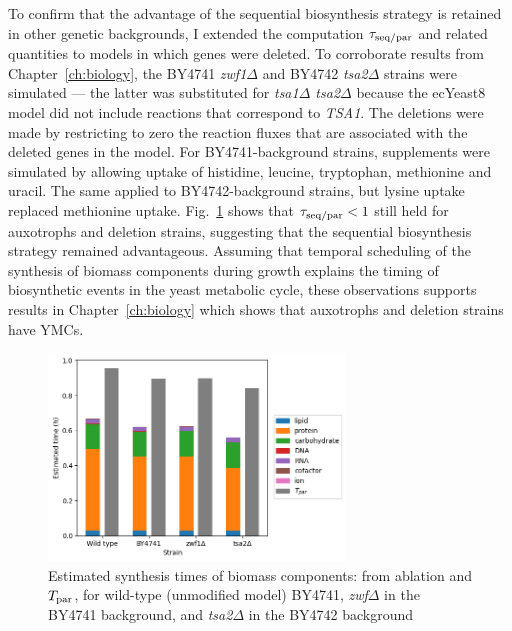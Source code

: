 To confirm that the advantage of the sequential biosynthesis strategy is retained in other genetic backgrounds, I extended the computation $\tau_{\mathrm{seq}/\mathrm{par}}$ and related quantities to models in which genes were deleted.
To corroborate results from Chapter~\ref{ch:biology}, the BY4741 \textit{zwf1$\Delta$} and BY4742 \textit{tsa2$\Delta$} strains were simulated --- the latter was substituted for \textit{tsa1$\Delta$ tsa2$\Delta$} because the ecYeast8 model did not include reactions that correspond to \textit{TSA1}.
The deletions were made by restricting to zero the reaction fluxes that are associated with the deleted genes in the model.
For BY4741-background strains, supplements were simulated by allowing uptake of histidine, leucine, tryptophan, methionine and uracil.
The same applied to BY4742-background strains, but lysine uptake replaced methionine uptake.
Fig.\ \ref{fig:model-ablation-strains} shows that $\tau_{\mathrm{seq}/\mathrm{par}} < 1$ still held for auxotrophs and deletion strains, suggesting that the sequential biosynthesis strategy remained advantageous.
Assuming that temporal scheduling of the synthesis of biomass components during growth explains the timing of biosynthetic events in the yeast metabolic cycle, these observations supports results in Chapter~\ref{ch:biology} which shows that auxotrophs and deletion strains have YMCs.

\begin{figure}
  \centering
  \includegraphics[width=0.7\textwidth]{deletions}

  \caption[
    Estimated synthesis times of biomass components, for BY4741, \textit{zwf$\Delta$}, and \textit{tsa2$\Delta$}
  ]{
    Estimated synthesis times of biomass components: from ablation and $T_{\mathrm{par}}$, for wild-type (unmodified model) BY4741, \textit{zwf$\Delta$} in the BY4741 background, and \textit{tsa2$\Delta$} in the BY4742 background
  }
  \label{fig:model-ablation-strains}
\end{figure}


